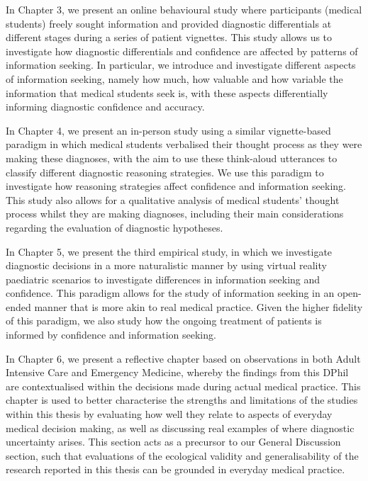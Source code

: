 \documentclass[a4paper, nobind]{templates/ociamthesis}
\begin{document}
\hfill\break
In Chapter 3, we present an online behavioural study where participants (medical students) freely sought information and provided diagnostic differentials at different stages during a series of patient vignettes. This study allows us to investigate how diagnostic differentials and confidence are affected by patterns of information seeking. In particular, we introduce and investigate different aspects of information seeking, namely how much, how valuable and how variable the information that medical students seek is, with these aspects differentially informing diagnostic confidence and accuracy.

\hfill\break
In Chapter 4, we present an in-person study using a similar vignette-based paradigm in which medical students verbalised their thought process as they were making these diagnoses, with the aim to use these think-aloud utterances to classify different diagnostic reasoning strategies. We use this paradigm to investigate how reasoning strategies affect confidence and information seeking. This study also allows for a qualitative analysis of medical students' thought process whilst they are making diagnoses, including their main considerations regarding the evaluation of diagnostic hypotheses.

\hfill\break
In Chapter 5, we present the third empirical study, in which we investigate diagnostic decisions in a more naturalistic manner by using virtual reality paediatric scenarios to investigate differences in information seeking and confidence. This paradigm allows for the study of information seeking in an open-ended manner that is more akin to real medical practice. Given the higher fidelity of this paradigm, we also study how the ongoing treatment of patients is informed by confidence and information seeking.

\hfill\break
In Chapter 6, we present a reflective chapter based on observations in both Adult Intensive Care and Emergency Medicine, whereby the findings from this DPhil are contextualised within the decisions made during actual medical practice. This chapter is used to better characterise the strengths and limitations of the studies within this thesis by evaluating how well they relate to aspects of everyday medical decision making, as well as discussing real examples of where diagnostic uncertainty arises. This section acts as a precursor to our General Discussion section, such that evaluations of the ecological validity and generalisability of the research reported in this thesis can be grounded in everyday medical practice.
\end{document}
